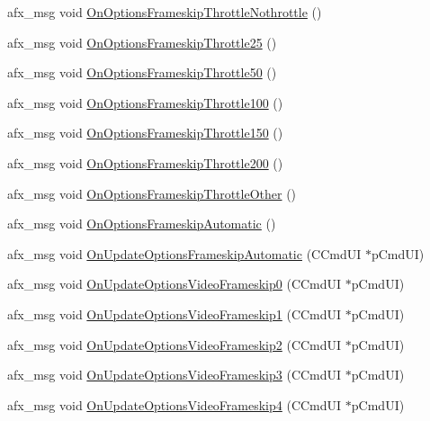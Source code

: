 \begin{DoxyCompactItemize}
\item 
afx\+\_\+msg void \mbox{\hyperlink{class_main_wnd_a54d38aa98017f7e37c6b8938a480b9ce}{On\+Options\+Frameskip\+Throttle\+Nothrottle}} ()
\item 
afx\+\_\+msg void \mbox{\hyperlink{class_main_wnd_aabf5abcedfd47af722f1c42e8363b568}{On\+Options\+Frameskip\+Throttle25}} ()
\item 
afx\+\_\+msg void \mbox{\hyperlink{class_main_wnd_a40d884dcce34c24b6fa501f8e056af46}{On\+Options\+Frameskip\+Throttle50}} ()
\item 
afx\+\_\+msg void \mbox{\hyperlink{class_main_wnd_aa16e562b5f9e456543112253588f57be}{On\+Options\+Frameskip\+Throttle100}} ()
\item 
afx\+\_\+msg void \mbox{\hyperlink{class_main_wnd_a39292c20b9a0cddfbd60d5230bbe0b3e}{On\+Options\+Frameskip\+Throttle150}} ()
\item 
afx\+\_\+msg void \mbox{\hyperlink{class_main_wnd_a989cf9b90b96b67c9c016cd3652d2e6e}{On\+Options\+Frameskip\+Throttle200}} ()
\item 
afx\+\_\+msg void \mbox{\hyperlink{class_main_wnd_ae29a4d47a221049a8fbdc820ea6fffa9}{On\+Options\+Frameskip\+Throttle\+Other}} ()
\item 
afx\+\_\+msg void \mbox{\hyperlink{class_main_wnd_aafb7bdce8ddf0dbe3420c1f5fcd9fd62}{On\+Options\+Frameskip\+Automatic}} ()
\item 
afx\+\_\+msg void \mbox{\hyperlink{class_main_wnd_ae5649490db983b067dbb0827ce64b14c}{On\+Update\+Options\+Frameskip\+Automatic}} (C\+Cmd\+UI $\ast$p\+Cmd\+UI)
\item 
afx\+\_\+msg void \mbox{\hyperlink{class_main_wnd_a81fdf41b0bef9ec1cef244c686c5d740}{On\+Update\+Options\+Video\+Frameskip0}} (C\+Cmd\+UI $\ast$p\+Cmd\+UI)
\item 
afx\+\_\+msg void \mbox{\hyperlink{class_main_wnd_a7f66c2de8b4946bd0c48b8124365cbfd}{On\+Update\+Options\+Video\+Frameskip1}} (C\+Cmd\+UI $\ast$p\+Cmd\+UI)
\item 
afx\+\_\+msg void \mbox{\hyperlink{class_main_wnd_ab6f8fbd462e7b2079a185074d54c205c}{On\+Update\+Options\+Video\+Frameskip2}} (C\+Cmd\+UI $\ast$p\+Cmd\+UI)
\item 
afx\+\_\+msg void \mbox{\hyperlink{class_main_wnd_a700b4eb8a69599721b04abba60a9aad8}{On\+Update\+Options\+Video\+Frameskip3}} (C\+Cmd\+UI $\ast$p\+Cmd\+UI)
\item 
afx\+\_\+msg void \mbox{\hyperlink{class_main_wnd_a793b2ef26a9ac27dbfb59dbf86175207}{On\+Update\+Options\+Video\+Frameskip4}} (C\+Cmd\+UI $\ast$p\+Cmd\+UI)

\end{DoxyCompactItemize}
